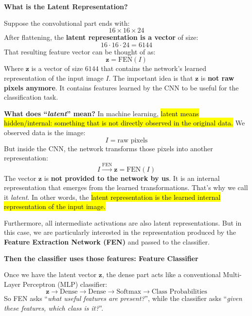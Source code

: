 \highspace
\begin{flushleft}
    \textcolor{Green3}{ \textbf{What is the Latent Representation?}}
\end{flushleft}
Suppose the convolutional part ends with:
\begin{equation*}
    16 \times 16 \times 24
\end{equation*}
After flattening, the \textbf{latent representation is a vector} of size:
\begin{equation*}
    16 \cdot 16 \cdot 24 = 6144
\end{equation*}
That resulting feature vector can be thought of as:
\begin{equation*}
    \mathbf{z} = \mathrm{FEN}(I)
\end{equation*}
Where $\mathbf{z}$ is a vector of size $6144$ that contains the network's learned representation of the input image $I$. The important idea is that $\mathbf{z}$ is \textbf{not raw pixels anymore}. It contains features learned by the CNN to be useful for the classification task.

\highspace
\textcolor{Green3}{ \textbf{What does ``\emph{latent}'' mean?}} In machine learning, \hl{latent means hidden/internal: something that is not directly observed in the original data.} We observed data is the image:
\begin{equation*}
    I = \text{raw pixels}
\end{equation*}
But inside the CNN, the network transforms those pixels into another representation:
\begin{equation*}
    I \xrightarrow{\text{FEN}} \mathbf{z} = \mathrm{FEN}(I)
\end{equation*}
The vector $\mathbf{z}$ is \textbf{not provided to the network by us}. It is an internal representation that emerges from the learned transformations. That's why we call it \emph{latent}. In other words, the \hl{latent representation is the learned internal representation of the input image.}

\highspace
Furthermore, all intermediate activations are also latent representations. But in this case, we are particularly interested in the representation produced by the \textbf{Feature Extraction Network (FEN)} and passed to the classifier.

\highspace
\begin{flushleft}
    \textcolor{Green3}{ \textbf{Then the classifier uses those features: Feature Classifier}}
\end{flushleft}
Once we have the latent vector $\mathbf{z}$, the dense part acts like a conventional Multi-Layer Perceptron (MLP) classifier:
\begin{equation*}
    \mathbf{z} \to \text{Dense} \to \text{Dense} \to \text{Softmax} \to \text{Class Probabilities}
\end{equation*}
So FEN asks ``\emph{what useful features are present?}'', while the classifier asks ``\emph{given these features, which class is it?}''.

